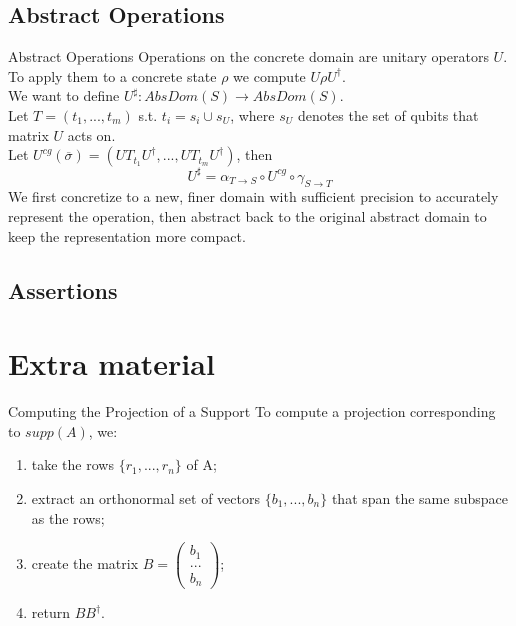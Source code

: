 \documentclass[11pt,svgnames,smaller,aspectratio=43,english]{beamer}
\begin{document}
\subsection{Abstract Operations}
\begin{frame}{Abstract Operations}
	Operations on the concrete domain are unitary operators $U$.\\
	To apply them to a concrete state $\rho$ we compute $U\rho U^\dagger$.\\
	We want to define $U^\sharp: \mathit{AbsDom}(S) \rightarrow \mathit{AbsDom}(S)$.\\
	\vspace*{1em}
	Let $T = (t_1, ..., t_m)$ s.t. $t_i = s_i \cup s_U$, where $s_U$ denotes the set of qubits that matrix $U$ acts on.\\

	Let $U^{cg}(\overline{\sigma}) = (UT_{t_1}U^\dagger, ..., UT_{t_m}U^\dagger)$, then
	\begin{equation*}
		U^\sharp = \alpha_{T \rightarrow S} \circ U^{cg} \circ \gamma_{S \rightarrow T}
	\end{equation*}
	We first concretize to a new, finer domain with sufficient precision to accurately represent the operation, then abstract back to the original abstract domain to keep the representation more compact.
\end{frame}

\subsection{Assertions}

\section*{Extra material}
\begin{frame}{Computing the Projection of a Support}
	To compute a projection corresponding to $supp(A)$, we:
	\begin{enumerate}
		\item take the rows $\{r_1, ..., r_n\}$ of A;
		\item extract an orthonormal set of vectors $\{b_1, ..., b_n\}$ that span the same subspace as the rows;
		\item create the matrix $B = \begin{pmatrix}
			b_1 \\ ... \\ b_n
		\end{pmatrix}$;
		\item return $BB^\dagger$.
	\end{enumerate}
\end{frame}
\end{document}
